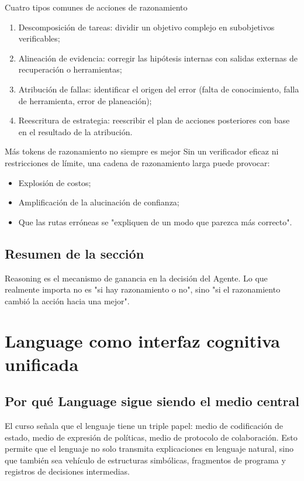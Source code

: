 \documentclass[a4paper]{article}
\begin{document}
\begin{knowledgebox}{Cuatro tipos comunes de acciones de razonamiento}
\begin{enumerate}
    \item Descomposición de tareas: dividir un objetivo complejo en subobjetivos verificables;
    \item Alineación de evidencia: corregir las hipótesis internas con salidas externas de recuperación o herramientas;
    \item Atribución de fallas: identificar el origen del error (falta de conocimiento, falla de herramienta, error de planeación);
    \item Reescritura de estrategia: reescribir el plan de acciones posteriores con base en el resultado de la atribución.
\end{enumerate}
\end{knowledgebox}

\begin{warningbox}{Más tokens de razonamiento no siempre es mejor}
Sin un verificador eficaz ni restricciones de límite, una cadena de razonamiento larga puede provocar:
\begin{itemize}
    \item Explosión de costos;
    \item Amplificación de la alucinación de confianza;
    \item Que las rutas erróneas se "expliquen de un modo que parezca más correcto".
\end{itemize}
\end{warningbox}

\subsection{Resumen de la sección}
Reasoning es el mecanismo de ganancia en la decisión del Agente. Lo que realmente importa no es "si hay razonamiento o no", sino "si el razonamiento cambió la acción hacia una mejor".
\section{Language como interfaz cognitiva unificada}

\subsection{Por qué Language sigue siendo el medio central}
El curso señala que el lenguaje tiene un triple papel: medio de codificación de estado, medio de expresión de políticas, medio de protocolo de colaboración. Esto permite que el lenguaje no solo transmita explicaciones en lenguaje natural, sino que también sea vehículo de estructuras simbólicas, fragmentos de programa y registros de decisiones intermedias.
\end{document}
